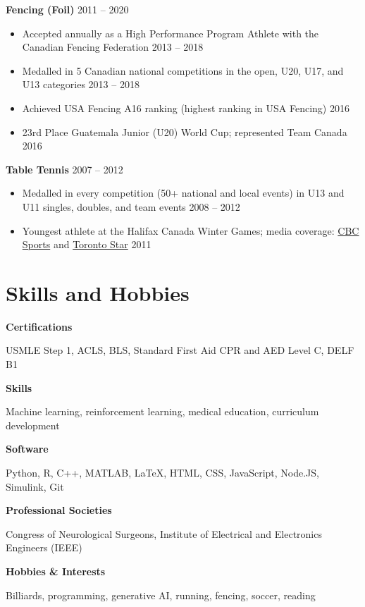 \documentclass{article}
\begin{document}
\textbf{Fencing (Foil)} \hfill 2011 -- 2020
\begin{itemize}
    \item Accepted annually as a High Performance Program Athlete with the Canadian Fencing Federation \hfill 2013 -- 2018
    \item Medalled in 5 Canadian national competitions in the open, U20, U17, and U13 categories \hfill 2013 -- 2018
    \item Achieved USA Fencing A16 ranking (highest ranking in USA Fencing) \hfill 2016
    \item 23rd Place Guatemala Junior (U20) World Cup; represented Team Canada \hfill 2016
\end{itemize} \vspace{1em}
\textbf{Table Tennis} \hfill 2007 -- 2012
\begin{itemize}
    \item Medalled in every competition (50+ national and local events) in U13 and U11 singles, doubles, and team events \hfill 2008 -- 2012
    \item Youngest athlete at the Halifax Canada Winter Games; media coverage: \href{https://www.cbc.ca/sports/2.723/table-tennis-player-10-turning-heads-in-halifax-1.1115785}{CBC Sports} and \href{https://www.thestar.com/sports/2011/02/22/10yearold_table_tennis_star_competes_against_pros.html}{Toronto Star} \hfill 2011
\end{itemize}


\section*{\textcolor{my_colour}{Skills and Hobbies}}
\vspace{-.25em} \hrulefill \vspace{.25em}

\textbf{Certifications} \hfill \parbox[t]{.8\linewidth}{USMLE Step 1, ACLS, BLS, Standard First Aid CPR and AED Level C, DELF B1}

\textbf{Skills} \hfill \parbox[t]{.8\linewidth}{Machine learning, reinforcement learning, medical education, curriculum development}

\textbf{Software} \hfill \parbox[t]{.8\linewidth}{Python, R, C++, MATLAB, \LaTeX, HTML, CSS, JavaScript, Node.JS, Simulink, Git}

\textbf{Professional Societies} \hfill \parbox[t]{0.8\linewidth}{Congress of Neurological Surgeons, Institute of Electrical and Electronics Engineers (IEEE)}

\textbf{Hobbies \& Interests} \hfill \parbox[t]{.8\linewidth}{Billiards, programming, generative AI, running, fencing, soccer, reading}
\end{document}
